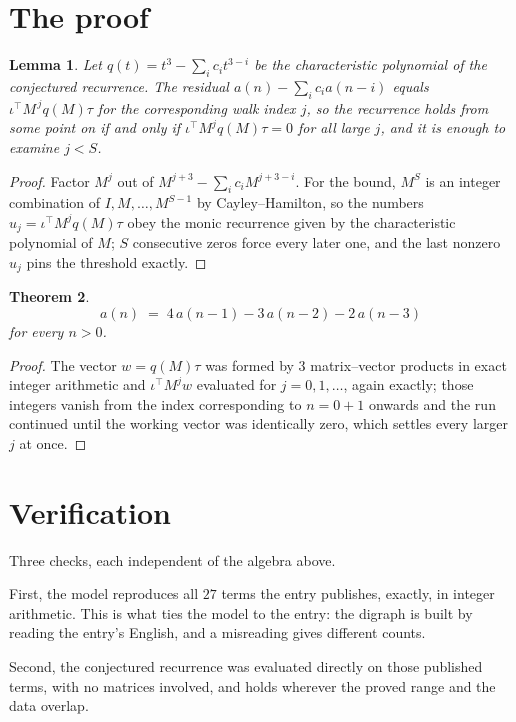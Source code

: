 \documentclass[11pt,a4paper]{article}
\theoremstyle{plain}
\newtheorem{theorem}{Theorem}
\newtheorem{lemma}[theorem]{Lemma}
\theoremstyle{definition}
\begin{document}
\section{The proof}

\begin{lemma}\label{lem:crit}
Let $q(t)=t^{3}-\sum_i c_it^{3-i}$ be the characteristic polynomial of the
conjectured recurrence. The residual $a(n)-\sum_ic_ia(n-i)$ equals
$\iota^{\!\top}M^{\,j}q(M)\tau$ for the corresponding walk index $j$, so the recurrence
holds from some point on if and only if $\iota^{\!\top}M^{j}q(M)\tau=0$ for all large $j$,
and it is enough to examine $j<S$.
\end{lemma}

\begin{proof}
Factor $M^{j}$ out of $M^{j+3}-\sum_ic_iM^{j+3-i}$. For the bound, $M^{S}$
is an integer combination of $I,M,\dots,M^{S-1}$ by Cayley--Hamilton, so the numbers
$u_j=\iota^{\!\top}M^{j}q(M)\tau$ obey the monic recurrence given by the characteristic
polynomial of $M$; $S$ consecutive zeros force every later one, and the last nonzero $u_j$
pins the threshold exactly.
\end{proof}

\begin{theorem}
\[
a(n)\;=\;4\,a(n-1) - 3\,a(n-2) - 2\,a(n-3)
\]
for every $n>0$.
\end{theorem}

\begin{proof}
The vector $w=q(M)\tau$ was formed by $3$ matrix--vector products in exact integer
arithmetic and $\iota^{\!\top}M^{j}w$ evaluated for $j=0,1,\dots$, again exactly; those
integers vanish from the index corresponding to $n=0+1$ onwards and the run continued
until the working vector was identically zero, which settles every larger $j$ at once.
\end{proof}

\section{Verification}

Three checks, each independent of the algebra above.

First, the model reproduces all $27$ terms the entry publishes, exactly, in integer
arithmetic. This is what ties the model to the entry: the digraph is built by reading the
entry's English, and a misreading gives different counts.

Second, the conjectured recurrence was evaluated directly on those published terms, with no
matrices involved, and holds wherever the proved range and the data overlap.
\end{document}
